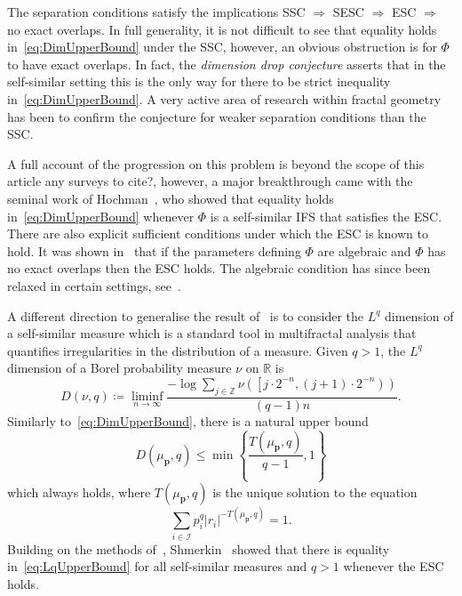 \documentclass[12pt,]{article}
\theoremstyle{definition}
\theoremstyle{remark}
\newcommand{\0}{\mathbf{0}}
\begin{document}
{The separation conditions satisfy the implications SSC $\Rightarrow$ SESC $\Rightarrow$ ESC
$\Rightarrow$ no exact overlaps. In full generality, it is not difficult to see that equality holds
in~\cref{eq:DimUpperBound} under the SSC, however, an obvious obstruction is for $\Phi$ to have
exact overlaps. In fact, the \emph{dimension drop conjecture} asserts that in the self-similar setting this is the only way for there to be strict inequality in~\cref{eq:DimUpperBound}. A very active area of research within fractal geometry has been to confirm the conjecture for weaker separation conditions than the SSC. 

A full account of the progression on this problem is beyond the scope of this article {\color{red}any surveys to cite?}, however, a major breakthrough came with the seminal work of Hochman~\cite{Hochman_SelfSimESC_Annals}, who showed that equality holds in~\cref{eq:DimUpperBound} whenever $\Phi$ is a self-similar IFS that satisfies the ESC. There are also explicit sufficient conditions under which the ESC is known to hold. It was shown in~\cite{Hochman_SelfSimESC_Annals} that if the parameters defining $\Phi$ are algebraic and $\Phi$ has no exact overlaps then the ESC holds. The algebraic condition has since been relaxed in certain settings, see~\cite{FengFeng_DimHomoIFSAlgebraicTrans_arxiv, Rapaport_ExactOverlapsAlgebraicContr, RapaportVarju_Duke24, Varju_BernConv_Annals19}.

A different direction to generalise the result of~\cite{Hochman_SelfSimESC_Annals} is to consider the $L^q$ dimension of a self-similar measure which is a standard tool in multifractal analysis that quantifies irregularities in the distribution of a measure. Given $q>1$, the $L^q$ dimension of a Borel probability measure $\nu$ on $\mathbb{R}$ is 
\begin{equation*}
D(\nu, q)\coloneqq\liminf _{n \rightarrow \infty} \frac{-\log \sum_{j \in \mathbb{Z}} \nu\left(\left[j \cdot 2^{-n},(j+1) \cdot 2^{-n}\right)\right)}{(q-1) n} .
\end{equation*}
Similarly to~\cref{eq:DimUpperBound}, there is a natural upper bound 
\begin{equation}\label{eq:LqUpperBound}
	D(\mu_{\mathbf{p}}, q) \leq \min \left\{\frac{T(\mu_{\mathbf{p}}, q)}{q-1} ,1\right\}
\end{equation}
which always holds, where $T(\mu_{\mathbf{p}}, q)$ is the unique solution to the equation
\begin{equation*}
	\sum_{i \in \mathcal{I}} p_i^q\left|r_i\right|^{-T(\mu_{\mathbf{p}}, q)}=1 .
\end{equation*}
Building on the methods of~\cite{Hochman_SelfSimESC_Annals}, Shmerkin~\cite{Shmerkin_LqSelfSim_Annals}  showed that there is equality in~\cref{eq:LqUpperBound} for all self-similar measures and $q>1$ whenever the ESC holds. 


}
\end{document}

